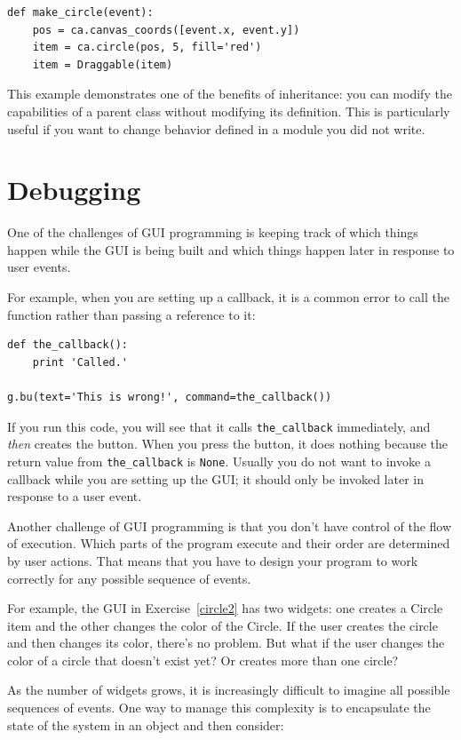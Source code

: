 \documentclass[10pt]{book}
\begin{document}
\begin{verbatim}
def make_circle(event):
    pos = ca.canvas_coords([event.x, event.y])
    item = ca.circle(pos, 5, fill='red')
    item = Draggable(item)
\end{verbatim}
%
This example demonstrates one of the benefits of inheritance: you can
modify the capabilities of a parent class without modifying its
definition.  This is particularly useful if you want to change
behavior defined in a module you did not write.


\section{Debugging}

One of the challenges of GUI programming is keeping track of
which things happen while the GUI is being built and which
things happen later in response to user events.

For example, when you are setting up a callback, it is a common error
to call the function rather than passing a reference to it:

\begin{verbatim}
def the_callback():
    print 'Called.'

g.bu(text='This is wrong!', command=the_callback())
\end{verbatim}
%
If you run this code, you will see that it calls \verb"the_callback"
immediately, and {\em then} creates the button.  When you press the
button, it does nothing because the return value from
\verb"the_callback" is {\tt None}.
Usually you do not want to invoke a callback while you are
setting up the GUI; it should only be invoked later in response to
a user event.

Another challenge of GUI programming is that you don't have control
of the flow of execution.  Which parts of the program execute
and their order are determined by user actions.
That means that you have to design your program to work correctly
for any possible sequence of events.

For example, the GUI in Exercise~\ref{circle2} has two widgets:
one creates a Circle item and the other changes the color of the
Circle.  If the user creates the circle and then changes its color,
there's no problem.  But what if the user changes the color of
a circle that doesn't exist yet?  Or creates more than one circle?

As the number of widgets grows, it is increasingly difficult to
imagine all possible sequences of events.  One way to manage this
complexity is to encapsulate the state of the system in an object
and then consider:
\end{document}
